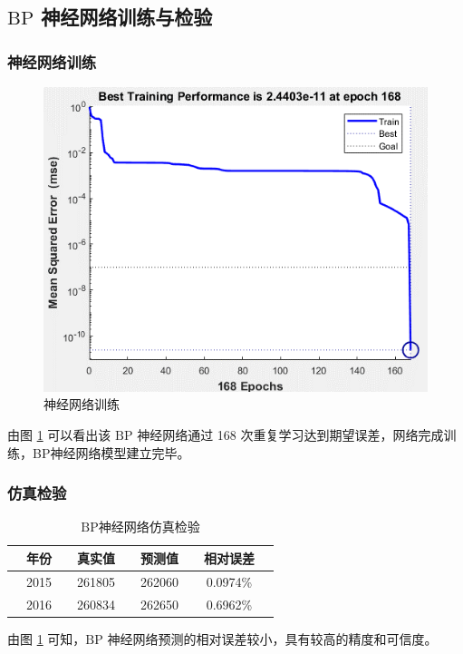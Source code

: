 \subsection{$\mathrm{BP}$ 神经网络训练与检验}

  \subsubsection{神经网络训练}
    \begin{figure}[htbp]
      \centering
      \includegraphics[width=0.618\paperwidth]{figures/muxinxunlian.png}
      \caption{神经网络训练}
      \label{fig:wanluoxunlian}
    \end{figure}
    由图 \ref{fig:wanluoxunlian} 可以看出该 $\mathrm{BP}$ 神经网络通过 168 次重复学习达到期望误差，网络完成训练，BP神经网络模型建立完毕。

  \subsubsection{仿真检验}
    \begin{table}[htb]
      \centering
      \caption{$\mathrm{BP}$神经网络仿真检验}
      \begin{tabular*}{0.618\paperwidth}{@{\extracolsep{\fill}}ccccccccc}
        \toprule[1.5pt]
        &年份 && 真实值 && 预测值 && 相对误差 &\\
        \midrule[1pt]
        &2015 && 261805 && 262060 && 0.0974\% &\\
        &2016 && 260834 && 262650 && 0.6962\% &\\
        \bottomrule[1.5pt]
      \end{tabular*}
      \label{tab:fanzhenjianyan}
    \end{table}
    由图 \ref{tab:fanzhenjianyan} 可知，$\mathrm{BP}$ 神经网络预测的相对误差较小，具有较高的精度和可信度。